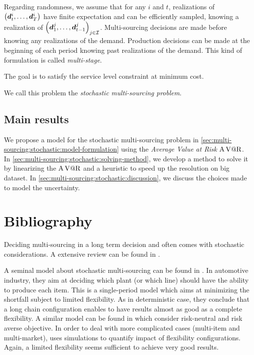 Regarding randomness, we assume that for any $i$ and $t$, realizations of $\bracket{\va\demand_t^i,\ldots,\va\demand_{\horizon}^i}$ have finite expectation and can be efficiently sampled, knowing a realization of $\bracket{\va\demand_1^j,\ldots,\va\demand_{t-1}^j}_{j\in\REF}$.
Multi-sourcing decisions are made before knowing any realizations of the demand.
Production decisions can be made at the beginning of each period knowing past realizations of the demand.
This kind of formulation is called \emph{multi-stage}.


The goal is to satisfy the service level constraint at minimum cost.


We call this problem the \emph{stochastic multi-sourcing problem}.


\subsection{Main results}
\label{sec:multi-sourcing:stochastic:introduction:main-results}


We propose a model for the stochastic multi-sourcing problem in \cref{sec:multi-sourcing:stochastic:model-formulation} using the \emph{Average Value at Risk $\operatorname{A\operatorname{V@R}}$}.
In \cref{sec:multi-sourcing:stochastic:solving-method}, we develop a method to solve it by linearizing the $\operatorname{A\operatorname{V@R}}$ and a heuristic to speed up the resolution on big dataset.
In \cref{sec:multi-sourcing:stochastic:discussion}, we discuss the choices made to model the uncertainty.



\section{Bibliography}
\label{sec:multi-sourcing:stochastic:bibliography}


Deciding multi-sourcing in a long term decision and often comes with stochastic considerations.
A extensive review can be found in \citet{Yao2017}.


A seminal model about stochastic multi-sourcing can be found in \citet{Jordan1995}.
In automotive industry, they aim at deciding which plant (or which line) should have the ability to produce each item.
This is a single-period model which aims at minimizing the shortfall subject to limited flexibility.
As in deterministic case, they conclude that a long chain configuration enables to have results almost as good as a complete flexibility.
A similar model can be found in \citet{Brian2005} which consider risk-neutral and risk averse objective.
In order to deal with more complicated cases (multi-item and multi-market), \citet{Garavelli2003} uses simulations to quantify impact of flexibility configurations.
Again, a limited flexibility seems sufficient to achieve very good results.


